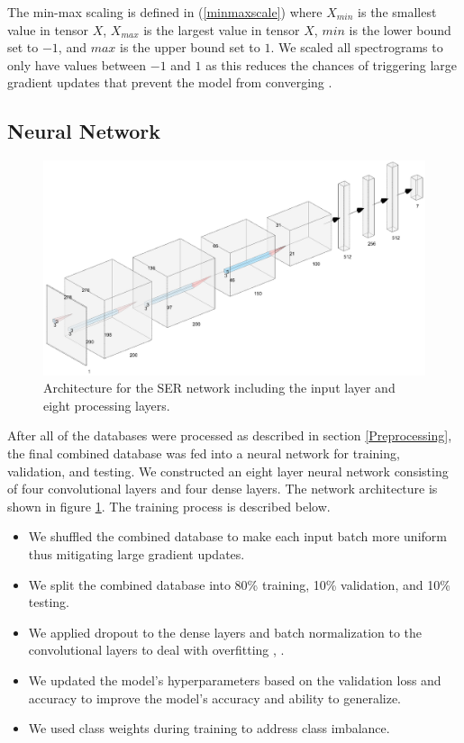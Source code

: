 \documentclass[a4paper, 10pt, conference]{ieeeconf}      %
\begin{document}
The min-max scaling is defined in (\ref{minmaxscale}) where $X_{min}$ is the smallest value in tensor $X$, $X_{max}$ is the largest value in tensor $X$, $min$ is the lower bound set to $-1$, and $max$ is the upper bound set to $1$. We scaled all spectrograms to only have values between $-1$ and $1$ as this reduces the chances of triggering large gradient updates that prevent the model from converging \cite{Chollet2017}.

\subsection{Neural Network}

\begin{figure}
	\centering
	\hspace{6mm}
	\includegraphics[width=\linewidth]{neural_network_architecture.png}
	\caption{Architecture for the SER network including the input layer and eight processing layers.}
	\label{neuralNetworkArchitecture}
\end{figure}

After all of the databases were processed as described in section \ref{Preprocessing}, the final combined database was fed into a neural network for training, validation, and testing. We constructed an eight layer neural network consisting of four convolutional layers and four dense layers. The network architecture is shown in figure \ref{neuralNetworkArchitecture}. The training process is described below.
\begin{itemize}
	\item We shuffled the combined database to make each input batch more uniform thus mitigating large gradient updates.
	\item We split the combined database into 80\% training, 10\% validation, and 10\% testing.
	\item We applied dropout to the dense layers and batch normalization to the convolutional layers to deal with overfitting \cite{Srivastava2014}, \cite{Ioffe2015}.
	\item We updated the model's hyperparameters based on the validation loss and accuracy to improve the model's accuracy and ability to generalize.
	\item We used class weights during training to address class imbalance.
\end{itemize}
\end{document}
